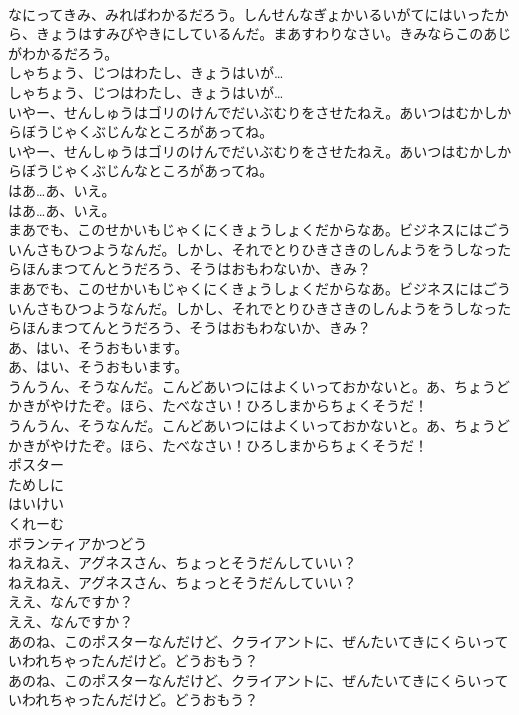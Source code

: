 \documentclass[8pt]{extreport}
\begin{document}
\begin{CJK}{UTF8}{min}
\\	なにってきみ、みればわかるだろう。しんせんなぎょかいるいがてにはいったから、きょうはすみびやきにしているんだ。まあすわりなさい。きみならこのあじがわかるだろう。 
\\	しゃちょう、じつはわたし、きょうはいが…	
\\	しゃちょう、じつはわたし、きょうはいが… 
\\	いやー、せんしゅうはゴリのけんでだいぶむりをさせたねえ。あいつはむかしからぼうじゃくぶじんなところがあってね。	
\\	いやー、せんしゅうはゴリのけんでだいぶむりをさせたねえ。あいつはむかしからぼうじゃくぶじんなところがあってね。 
\\	はあ…あ、いえ。	
\\	はあ…あ、いえ。 
\\	まあでも、このせかいもじゃくにくきょうしょくだからなあ。ビジネスにはごういんさもひつようなんだ。しかし、それでとりひきさきのしんようをうしなったらほんまつてんとうだろう、そうはおもわないか、きみ？	
\\	まあでも、このせかいもじゃくにくきょうしょくだからなあ。ビジネスにはごういんさもひつようなんだ。しかし、それでとりひきさきのしんようをうしなったらほんまつてんとうだろう、そうはおもわないか、きみ？ 
\\	あ、はい、そうおもいます。	
\\	あ、はい、そうおもいます。 
\\	うんうん、そうなんだ。こんどあいつにはよくいっておかないと。あ、ちょうどかきがやけたぞ。ほら、たべなさい！ひろしまからちょくそうだ！	
\\	うんうん、そうなんだ。こんどあいつにはよくいっておかないと。あ、ちょうどかきがやけたぞ。ほら、たべなさい！ひろしまからちょくそうだ！ 
\\	ポスター
\\	ためしに
\\	はいけい
\\	くれーむ
\\	ボランティアかつどう
\\	ねえねえ、アグネスさん、ちょっとそうだんしていい？	
\\	ねえねえ、アグネスさん、ちょっとそうだんしていい？ 
\\	ええ、なんですか？	
\\	ええ、なんですか？ 
\\	あのね、このポスターなんだけど、クライアントに、ぜんたいてきにくらいっていわれちゃったんだけど。どうおもう？	
\\	あのね、このポスターなんだけど、クライアントに、ぜんたいてきにくらいっていわれちゃったんだけど。どうおもう？ 

\end{CJK}
\end{document}
